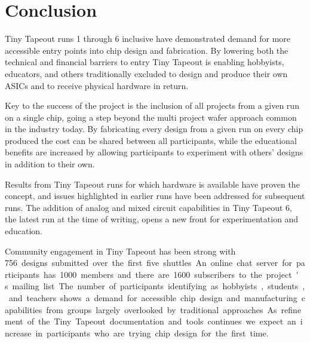 \section{Conclusion}
\label{sec:conclusion}

Tiny Tapeout runs 1 through 6 inclusive have demonstrated demand for more accessible entry points into chip design and fabrication. By lowering both the technical and financial barriers to entry Tiny Tapeout is enabling hobbyists, educators, and others traditionally excluded to design and produce their own ASICs and to receive physical hardware in return.

Key to the success of the project is the inclusion of all projects from a given run on a single chip, going a step beyond the multi project wafer approach common in the industry today. By fabricating every design from a given run on every chip produced the cost can be shared between all participants, while the educational benefits are increased by allowing participants to experiment with others' designs in addition to their own.

Results from Tiny Tapeout runs for which hardware is available have proven the concept, and issues highlighted in earlier runs have been addressed for subsequent runs. The addition of analog and mixed circuit capabilities in Tiny Tapeout 6, the latest run at the time of writing, opens a new front for experimentation and education.

Community engagement in Tiny Tapeout has been strong with \qty{756} designs submitted over the first five shuttles. An online chat server for participants has \qty{1000} members and there are \qty{1600} subscribers to the project's mailing list.

The number of participants identifying as hobbyists, students, and teachers shows a demand for accessible chip design and manufacturing capabilities from groups largely overlooked by traditional approaches. As refinement of the Tiny Tapeout documentation and tools continues we expect an increase in participants who are trying chip design for the first time.
